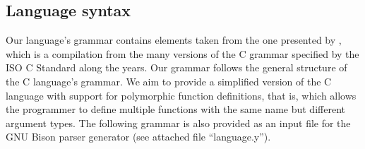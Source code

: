 \subsection{Language syntax}

Our language's grammar contains elements taken from the one presented by \textcite{Harbison2002},
which is a compilation from the many versions of the C grammar specified by the ISO C Standard
along the years. Our grammar follows the general structure of the C language's grammar.
We aim to provide a simplified version of the C language with support for polymorphic function
definitions, that is, which allows the programmer to define multiple functions with the same name
but different argument types. The following grammar is also provided as an input file for the
GNU Bison \cite{BISON} parser generator (see attached file ``language.y'').

